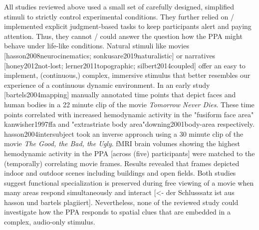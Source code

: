 \documentclass[english]{article}
\begin{document}
All studies reviewed above used a small set of carefully designed, simplified stimuli to strictly control experimental conditions. They further relied on / implemented explicit judgment-based tasks to keep participants alert and paying attention. Thus, they cannot / could answer the question how the PPA might behave under life-like conditions. Natural stimuli like movies [hasson2008neurocinematics; sonkusare2019naturalistic] or narratives [honey2012not-lost; lerner2011topographic; silbert2014coupled] offer an easy to implement, (continuous,) complex, immersive stimulus that better resembles our experience of a continuous dynamic environment.
In an early study [bartels2004mapping] manually annotated time points that depict faces and human bodies in a 22 minute clip of the movie \textit{Tomorrow Never Dies}. These time points correlated with increased hemodynamic activity in the "fusiform face area" {kanwisher1997ffa} and "extrastriate body area"{downing2001body-area} respectively.
{hasson2004intersubject} took an inverse approach using a 30 minute clip of the movie \textit{The Good, the Bad, the Ugly}. fMRI brain volumes showing the highest hemodynamic activity in the PPA [across (five) participants] were matched to the (temporally) correlating movie frames. Results revealed that frames depicted indoor and outdoor scenes including buildings and open fields.
Both studies suggest functional specialization is preserved during free viewing of a movie when many areas respond simultaneously and interact [<- der Schlusssatz ist aus hasson und bartels plagiiert]. Nevertheless, none of the reviewed study could investigate how the PPA responds to spatial clues that are embedded in a complex, audio-only stimulus.
\end{document}
